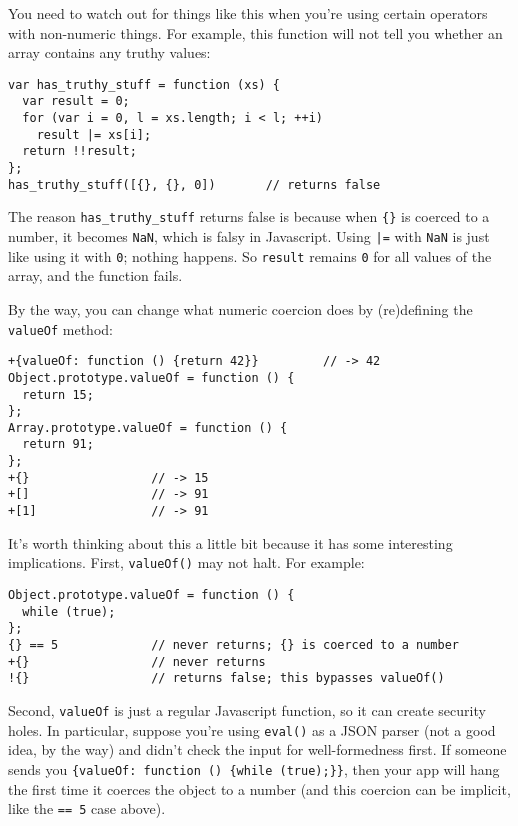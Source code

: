 \documentclass{article}
\begin{document}
    You need to watch out for things like this when you're using certain operators with non-numeric things. For example, this function will not tell you whether an array contains any truthy
    values:

\begin{verbatim}
var has_truthy_stuff = function (xs) {
  var result = 0;
  for (var i = 0, l = xs.length; i < l; ++i)
    result |= xs[i];
  return !!result;
};
has_truthy_stuff([{}, {}, 0])       // returns false
\end{verbatim}

    The reason \verb|has_truthy_stuff| returns false is because when \verb|{}| is coerced to a number, it becomes {\tt NaN}, which is falsy in Javascript. Using \verb+|=+ with {\tt NaN} is
    just like using it with {\tt 0}; nothing happens. So {\tt result} remains {\tt 0} for all values of the array, and the function fails.

    By the way, you can change what numeric coercion does by (re)defining the {\tt valueOf} method:

\begin{verbatim}
+{valueOf: function () {return 42}}         // -> 42
Object.prototype.valueOf = function () {
  return 15;
};
Array.prototype.valueOf = function () {
  return 91;
};
+{}                 // -> 15
+[]                 // -> 91
+[1]                // -> 91
\end{verbatim}

    It's worth thinking about this a little bit because it has some interesting implications. First, {\tt valueOf()} may not halt. For example:

\begin{verbatim}
Object.prototype.valueOf = function () {
  while (true);
};
{} == 5             // never returns; {} is coerced to a number
+{}                 // never returns
!{}                 // returns false; this bypasses valueOf()
\end{verbatim}

    Second, {\tt valueOf} is just a regular Javascript function, so it can create security holes. In particular, suppose you're using {\tt eval()} as a JSON parser (not a good idea, by the
    way) and didn't check the input for well-formedness first. If someone sends you \verb|{valueOf: function () {while (true);}}|, then your app will hang the first time it coerces the object
    to a number (and this coercion can be implicit, like the {\tt == 5} case above).
\end{document}
